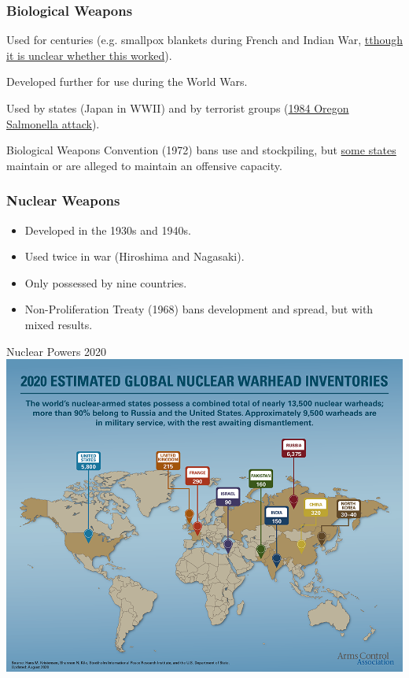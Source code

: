 \documentclass{beamer}
\begin{document}
\begin{frame} 
\frametitle{\LARGE{Biological Weapons}}
\begin{itemize}
	\large{
		\item Used for centuries (e.g. smallpox blankets during French and Indian War, \href{https://www.history.com/news/colonists-native-americans-smallpox-blankets}{tthough it is unclear whether this worked}). \pause
		\item Developed further for use during the World Wars. \pause
		\item Used by states (Japan in WWII) and by terrorist groups (\href{https://en.wikipedia.org/wiki/1984_Rajneeshee_bioterror_attack}{1984 Oregon Salmonella attack}). \pause 
		\item Biological Weapons Convention (1972) bans use and stockpiling, but \href{https://www.armscontrol.org/factsheets/cbwprolif}{some states} maintain or are alleged to maintain an offensive capacity.
	}
\end{itemize}
\end{frame}

\begin{frame} 
\frametitle{\LARGE{Nuclear Weapons}}
\begin{itemize}
		\item Developed in the 1930s and 1940s. \pause
		\item Used twice in war (Hiroshima and Nagasaki). \pause
		\item Only possessed by nine countries. \pause 
		\item Non-Proliferation Treaty (1968) bans development and spread, but with mixed results.
\end{itemize}
\end{frame}

 \begin{frame}{\LARGE Nuclear Powers 2020}
    \centering
\includegraphics[width=\textwidth,height=0.9\textheight,keepaspectratio]{warheads.png}
\end{frame}
\end{document}

